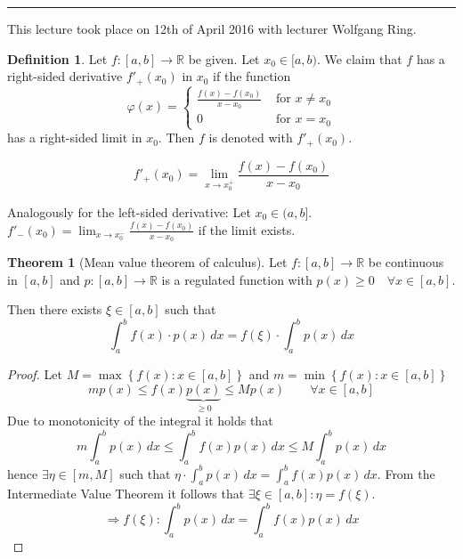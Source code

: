 \documentclass[a4paper,landscape,twocolumn]{article}
\theoremstyle{definition}
\newtheorem{theorem}{Theorem}
\newtheorem{defi}{Definition}
\newcommand\set[1]{\left\{#1\right\}}
\newcommand\meta[3]{\hrule{} This #1 took place on #2 with lecturer #3.\par}
\begin{document}
\meta{lecture}{12th of April 2016}{Wolfgang Ring}

\begin{defi}
  Let $f: [a,b] \to \mathbb R$ be given.
  Let $x_0 \in [a,b)$. We claim that $f$ has a right-sided derivative $f'_+(x_0)$ in $x_0$
  if the function
  \[
    \varphi(x) = \begin{cases}
      \frac{f(x) - f(x_0)}{x - x_0} & \text{ for } x \neq x_0 \\
      0                             & \text{ for } x = x_0
    \end{cases}
  \]
  has a right-sided limit in $x_0$.
  Then $f$ is denoted with $f'_+(x_0)$.

  \[ f'_+(x_0) = \lim_{x\to x_0^+} \frac{f(x) - f(x_0)}{x - x_0} \]

  Analogously for the left-sided derivative:
  Let $x_0 \in (a,b]$. $f'_-(x_0) = \lim_{x \to x_0^-} \frac{f(x) - f(x_0)}{x - x_0}$
  if the limit exists.
\end{defi}

\begin{theorem}[Mean value theorem of calculus]
  Let $f: [a,b] \to \mathbb R$ be continuous in $[a,b]$ and $p: [a,b] \to \mathbb R$
  is a regulated function with $p(x) \geq 0 \quad \forall x \in [a,b]$.

  Then there exists $\xi \in [a,b]$ such that
  \[ \int_a^b f(x) \cdot p(x) \, dx = f(\xi) \cdot \int_a^b p(x) \, dx \]
\end{theorem}

\begin{proof}
  Let $M = \max\set{f(x): x \in [a,b]}$ and $m = \min\set{f(x): x \in [a,b]}$
  \[ m p(x) \leq f(x) \underbrace{p(x)}_{\geq 0} \leq M p(x) \qquad \forall x \in [a,b] \]
  Due to monotonicity of the integral it holds that
  \[ m \int_a^b p(x) \, dx \leq \int_a^b f(x) p(x) \, dx \leq M \int_a^b p(x) \, dx \]
  hence $\exists \eta \in [m,M]$ such that $\eta \cdot \int_a^b p(x) \, dx = \int_a^b f(x) p(x) \, dx$.
  From the Intermediate Value Theorem it follows that $\exists \xi \in [a,b]: \eta = f(\xi)$.
  \[ \Rightarrow f(\xi): \int_a^b p(x) \, dx = \int_a^b f(x) p(x) \, dx \]
\end{proof}
\end{document}

